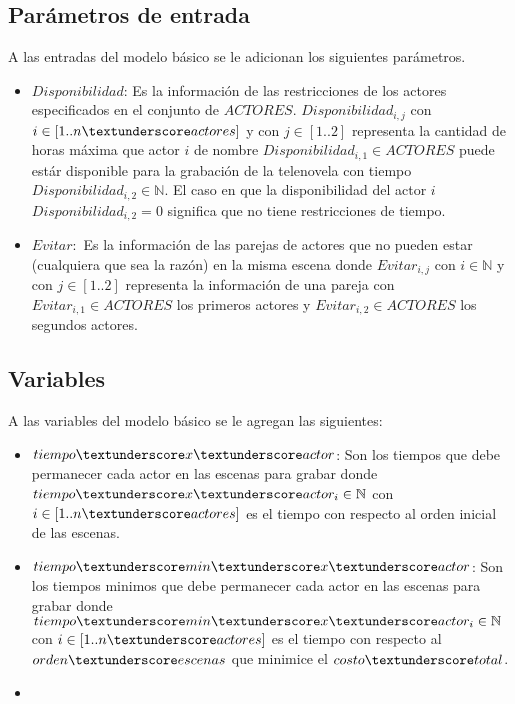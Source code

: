 \documentclass{article}
\begin{document}
\subsection{Parámetros de entrada}
A las entradas del modelo básico se le adicionan los siguientes parámetros.
\begin{itemize}
    \item $Disponibilidad$: Es la información de las restricciones de los actores especificados en el conjunto de $ACTORES$. $Disponibilidad_{i,j}$ con $i \in [1..n\textunderscore actores]$ y con $j \in [1..2]$ representa la cantidad de horas máxima que actor $i$ de nombre $Disponibilidad_{i,1} \in ACTORES$ puede estár disponible para la grabación de la telenovela con tiempo $Disponibilidad_{i,2} \in \mathbb{N} $. El caso en que la disponibilidad del actor $i$  $Disponibilidad_{i,2} = 0$ significa que no tiene restricciones de tiempo.
    \item $Evitar:$ Es la información de las parejas de actores que no 
    pueden estar (cualquiera que sea la razón) en la misma escena donde $Evitar_{i,j}$ con $i \in \mathbb{N}$ y con $j \in [1..2]$ representa la información de una pareja con $Evitar_{i,1} \in ACTORES$ los primeros actores y $Evitar_{i,2} \in ACTORES$ los segundos actores.
\end{itemize}

\subsection{Variables}
A las variables del modelo básico se le agregan las siguientes:
\begin{itemize}
    \item $tiempo\textunderscore x\textunderscore actor$: Son los tiempos que debe permanecer cada actor en las escenas para grabar donde $tiempo\textunderscore  x\textunderscore actor_i \in \mathbb{N}$ con $i \in [1..n\textunderscore actores]$ es el tiempo con respecto al orden inicial de las escenas.
    \item $tiempo\textunderscore min\textunderscore x\textunderscore actor$: Son los tiempos minimos que debe permanecer cada actor en las escenas para grabar donde $tiempo\textunderscore min\textunderscore x\textunderscore actor_i \in \mathbb{N}$ con $i \in [1..n\textunderscore actores]$ es el tiempo con respecto al $orden\textunderscore escenas$ que minimice el $costo\textunderscore total$.
    \item 
\end{itemize}
\end{document}
